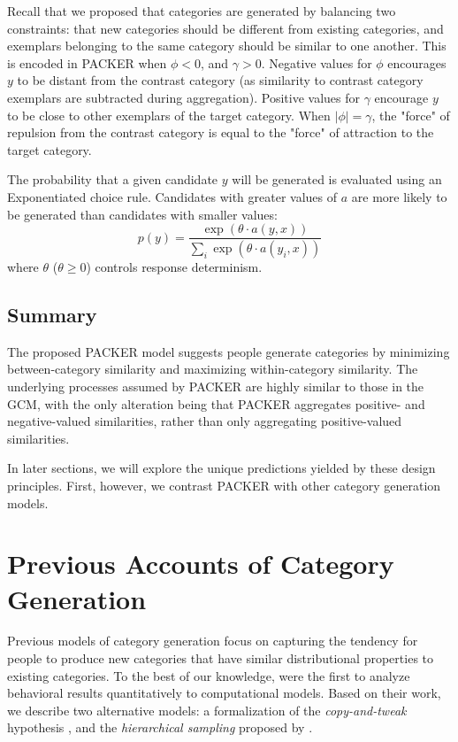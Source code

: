 \documentclass[10pt,letterpaper]{article}
\begin{document}
Recall that we proposed that categories are generated by balancing two constraints: that new categories should be different from existing categories, and exemplars belonging to the same category should be similar to one another. This is encoded in PACKER when $\phi < 0$, and $\gamma > 0$. Negative values for $\phi$ encourages $y$ to be distant from the contrast category (as similarity to contrast category exemplars are subtracted during aggregation). Positive values for $\gamma$ encourage $y$ to be close to other exemplars of the target category. When $|\phi| = \gamma$, the "force" of repulsion from the contrast category is equal to the "force" of attraction to the target category.

The probability that a given candidate $y$ will be generated is evaluated using an Exponentiated \citet{luce1977choice} choice rule. Candidates with greater values of $a$ are more likely to be generated than candidates with smaller values:
\begin{equation}
p(y) = \dfrac
    { \exp( { \theta \cdot a(y, x) } ) }
    { \sum_i{ \exp( { \theta \cdot a(y_i, x) } ) } }
    \label{eq:packer-choice}
\end{equation}
where $\theta$ ($\theta \geq 0$) controls response determinism. 

\subsection{Summary}
The proposed PACKER model suggests people generate categories by minimizing between-category similarity and maximizing within-category similarity. The underlying processes assumed by PACKER are highly similar to those in the GCM, with the only alteration being that PACKER aggregates positive- and negative-valued similarities, rather than only aggregating positive-valued similarities.

In later sections, we will explore the unique predictions yielded by these design principles. First, however, we contrast PACKER with other category generation models. 


\section{Previous Accounts of Category Generation}

Previous models of category generation focus on capturing the tendency for people to produce new categories that have similar distributional properties to existing categories. To the best of our knowledge, \citet{jern2013probabilistic} were the first to analyze behavioral results quantitatively to computational models. Based on their work, we describe two alternative models: a formalization of the \textit{copy-and-tweak} hypothesis \citep{ward2002role,ward1995s}, and the \textit{hierarchical sampling} proposed by \citet{jern2013probabilistic}.
\end{document}
